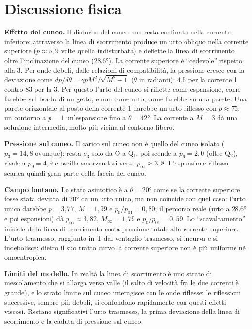 \documentclass[11pt,a4paper]{article}
\begin{document}
\section{Discussione fisica}
\textbf{Effetto del cuneo.} Il disturbo del cuneo non resta confinato nella corrente inferiore: attraverso la linea di
scorrimento produce un urto obliquo nella corrente superiore ($p\approx5{,}9$ volte quella indisturbata) e deflette
la linea di scorrimento oltre l'inclinazione del cuneo (\ang{28.6}). La corrente superiore è ``cedevole'' rispetto
alla 3. Per onde deboli, dalle relazioni di compatibilità, la pressione cresce con la deviazione come
$dp/d\theta=\gamma pM^2/\sqrt{M^2-1}$ ($\theta$ in radianti): 4,5 per la corrente 1 contro 83 per la 3. Per
questo l'urto del cuneo si riflette come espansione, come farebbe sul bordo di un getto, e non come urto, come
farebbe su una parete. Una parete orizzontale al posto della corrente 1 darebbe un urto riflesso con $p\approx75$; un
contorno a $p=1$ un'espansione fino a $\theta=\ang{42}$. La corrente a $M=3$ dà una soluzione intermedia, molto più
vicina al contorno libero.

\textbf{Pressione sul cuneo.} Il carico sul cuneo non è quello del cuneo isolato ($p_3=14{,}8$ ovunque): resta $p_3$
solo da O a Q$_1$, poi scende a $p_6=2{,}0$ (oltre Q$_2$), risale a $p_9=4{,}9$ e oscilla smorzandosi verso
$p_\infty\approx3{,}8$. L'espansione riflessa scarica quindi gran parte della faccia del cuneo.

\textbf{Campo lontano.} Lo stato asintotico è a $\theta=\ang{20}$ come se la corrente superiore fosse stata deviata di
\ang{20} da un urto unico, ma non coincide con quel caso: l'urto unico darebbe $p=3{,}77$, $M=1{,}99$ e
$p_0/p_{01}=0{,}80$; il percorso reale (urto a \ang{28.6} e poi espansioni) dà $p_\infty\approx3{,}82$,
$M_\infty=1{,}79$ e $p_0/p_{01}=0{,}59$. Lo ``scavalcamento'' iniziale della linea di scorrimento costa pressione
totale alla corrente superiore. L'urto trasmesso, raggiunto in T dal ventaglio trasmesso, si incurva e si indebolisce:
dietro il suo tratto curvo la corrente superiore non è più uniforme né omoentropica.

\textbf{Limiti del modello.} In realtà la linea di scorrimento è uno strato di mescolamento che si allarga verso
valle (il salto di velocità fra le due correnti è grande), e lo strato limite sul cuneo interagisce con le onde
riflesse: le riflessioni successive, sempre più deboli, si confondono rapidamente con questi effetti viscosi. Restano
significativi l'urto trasmesso, la prima deviazione della linea di scorrimento e la caduta di pressione sul cuneo.
\end{document}

